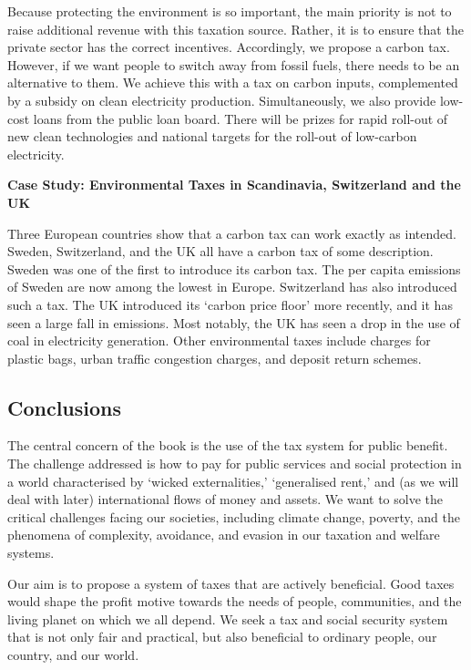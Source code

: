 \documentclass[]{tufte-handout}
\begin{document}
Because protecting the environment is so important, the main priority is
not to raise additional revenue with this taxation source. Rather, it is
to ensure that the private sector has the correct incentives.
Accordingly, we propose a carbon tax. However, if we want people to
switch away from fossil fuels, there needs to be an alternative to them.
We achieve this with a tax on carbon inputs, complemented by a subsidy
on clean electricity production. Simultaneously, we also provide
low-cost loans from the public loan board. There will be prizes for
rapid roll-out of new clean technologies and national targets for the
roll-out of low-carbon electricity.

\textbf{Case Study: Environmental Taxes in Scandinavia, Switzerland and
the UK}

Three European countries show that a carbon tax can work exactly as
intended. Sweden, Switzerland, and the UK all have a carbon tax of some
description. Sweden was one of the first to introduce its carbon tax.
The per capita emissions of Sweden are now among the lowest in Europe.
Switzerland has also introduced such a tax. The UK introduced its
`carbon price floor' more recently, and it has seen a large fall in
emissions. Most notably, the UK has seen a drop in the use of coal in
electricity generation. Other environmental taxes include charges for
plastic bags, urban traffic congestion charges, and deposit return
schemes.

\hypertarget{conclusions}{%
\subsection{Conclusions}\label{conclusions}}

The central concern of the book is the use of the tax system for public
benefit. The challenge addressed is how to pay for public services and
social protection in a world characterised by `wicked externalities,'
`generalised rent,' and (as we will deal with later) international flows
of money and assets. We want to solve the critical challenges facing our
societies, including climate change, poverty, and the phenomena of
complexity, avoidance, and evasion in our taxation and welfare systems.

Our aim is to propose a system of taxes that are actively beneficial.
Good taxes would shape the profit motive towards the needs of people,
communities, and the living planet on which we all depend. We seek a tax
and social security system that is not only fair and practical, but also
beneficial to ordinary people, our country, and our world.
\end{document}
